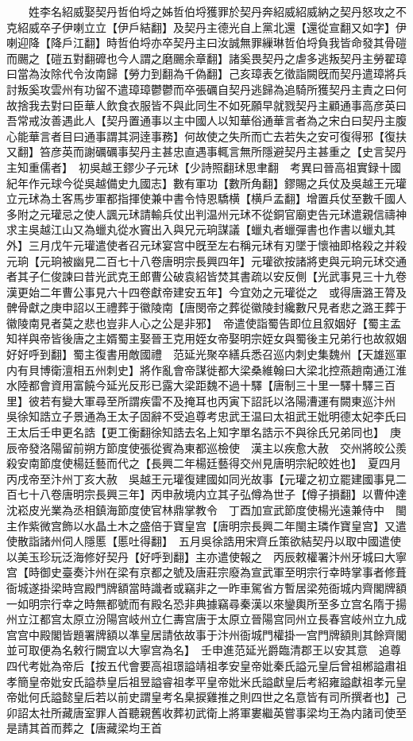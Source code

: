 　　姓李名紹威娶契丹哲伯埒之姊哲伯埒獲罪於契丹奔紹威紹威納之契丹怒攻之不克紹威卒子伊喇立立【伊戶結翻】及契丹主德光自上黨北還【還從宣翻又如字】伊喇迎降【降戶江翻】時哲伯埒亦卒契丹主曰汝誠無罪繅琳哲伯埒負我皆命發其骨磑而颺之【磑五對翻䃺也今人謂之磨颺余章翻】諸奚畏契丹之虐多逃叛契丹主勞翟璋曰當為汝除代令汝南歸【勞力到翻為千偽翻】己亥璋表乞徵詣闕旣而契丹遣璋將兵討叛奚攻雲州有功留不遣璋璋鬱鬱而卒張礪自契丹逃歸為追騎所獲契丹主責之曰何故捨我去對曰臣華人飲食衣服皆不與此同生不如死願早就戮契丹主顧通事高彦英曰吾常戒汝善遇此人【契丹置通事以主中國人以知華俗通華言者為之宋白曰契丹主腹心能華言者目曰通事謂其洞逹事務】何故使之失所而亡去若失之安可復得邪【復扶又翻】笞彦英而謝礪礪事契丹主甚忠直遇事輒言無所隱避契丹主甚重之【史言契丹主知重儒者】　初吳越王鏐少子元㺷【少詩照翻㺷思聿翻　考異曰晉高祖實録十國紀年作元球今從吳越備史九國志】數有軍功【數所角翻】鏐賜之兵仗及吳越王元瓘立元㺷為土客馬步軍都指揮使兼中書令恃恩驕横【横戶孟翻】增置兵仗至數千國人多附之元瓘忌之使人諷元㺷請輸兵仗出判温州元㺷不從銅官廟吏告元㺷遣親信禱神求主吳越江山又為蠟丸從水竇出入與兄元珦謀議【蠟丸者蠟彈書也作書以蠟丸其外】三月戊午元瓘遣使者召元㺷宴宫中旣至左右稱元㺷有刃墜于懷䄂即格殺之并殺元珦【元珦被幽見二百七十八卷唐明宗長興四年】元瓘欲按諸將吏與元珦元㺷交通者其子仁俊諫曰昔光武克王郎曹公破袁紹皆焚其書疏以安反側【光武事見三十九卷漢更始二年曹公事見六十四卷獻帝建安五年】今宜効之元瓘從之　或得唐潞王膂及髀骨獻之庚申詔以王禮葬于徽陵南【唐閔帝之葬從徽陵封纔數尺見者悲之潞王葬于徽陵南見者莫之悲也豈非人心之公是非邪】　帝遣使詣蜀告即位且叙姻好【蜀主孟知祥與帝皆後唐之主婿蜀主娶晉王克用姪女帝娶明宗姪女與蜀後主兄弟行也故叙姻好好呼到翻】蜀主復書用敵國禮　范延光聚卒繕兵悉召巡内刺史集魏州【天雄廵軍内有貝博衛澶相五州刺史】將作亂會帝謀徙都大梁桑維翰曰大梁北控燕趙南通江淮水陸都會資用富饒今延光反形已露大梁距魏不過十驛【唐制三十里一驛十驛三百里】彼若有變大軍尋至所謂疾雷不及掩耳也丙寅下詔託以洛陽漕運有闕東巡汴州　吳徐知誥立子景通為王太子固辭不受追尊考忠武王温曰太祖武王妣明德太妃李氏曰王太后壬申更名誥【更工衡翻徐知誥去名上知字單名誥示不與徐氏兄弟同也】　庚辰帝發洛陽留前朔方節度使張從賓為東都巡檢使　漢主以疾愈大赦　交州將皎公羨殺安南節度使楊廷藝而代之【長興二年楊廷藝得交州見唐明宗紀皎姓也】　夏四月丙戌帝至汴州丁亥大赦　吳越王元瓘復建國如同光故事【元瓘之初立罷建國事見二百七十八卷唐明宗長興三年】丙申赦境内立其子弘僔為世子【僔子損翻】以曹仲達沈崧皮光業為丞相鎮海節度使官林鼎掌教令　丁酉加宣武節度使楊光遠兼侍中　閩主作紫微宫飾以水晶土木之盛倍于寶皇宫【唐明宗長興二年閩主璘作寶皇宫】又遣使散詣諸州伺人隱慝【慝吐得翻】　五月吳徐誥用宋齊丘策欲結契丹以取中國遣使以美玉珍玩泛海修好契丹【好呼到翻】主亦遣使報之　丙辰敕權署汴州牙城曰大寧宫【時御史臺奏汴州在梁有京都之號及唐莊宗廢為宣武軍至明宗行幸時掌事者修葺衙城遂掛梁時宫殿門牌額當時識者或竊非之一昨車駕省方暫居梁苑衙城内齊閣牌額一如明宗行幸之時無都號而有殿名恐非典據竊尋秦漢以來鑾輿所至多立宫名隋于揚州立江都宫太原立汾陽宫岐州立仁夀宫唐于太原立晉陽宫同州立長春宫岐州立九成宫宫中殿閣皆題署牌額以凖皇居請依故事于汴州衙城門權掛一宫門牌額則其餘齊閣並可取便為名敕行闕宜以大寧宫為名】　壬申進范延光爵臨清郡王以安其意　追尊四代考妣為帝后【按五代會要高祖璟謚靖祖孝安皇帝妣秦氏謚元皇后曾祖郴謚肅祖孝簡皇帝妣安氏謚恭皇后祖昱謚睿祖孝平皇帝妣米氏謚獻皇后考紹雍謚獻祖孝元皇帝妣何氏謚懿皇后若以前史謂皇考名臬捩雞推之則四世之名意皆有司所撰者也】己卯詔太社所藏唐室罪人首聽親舊收葬初武衛上將軍婁繼英嘗事梁均王為内諸司使至是請其首而葬之【唐藏梁均王首
